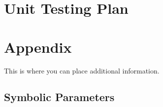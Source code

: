 \documentclass[12pt, titlepage]{article}
\begin{document}



					
					
					
					
					

					
					
					
					



				
\section{Unit Testing Plan}
		





\newpage

\section{Appendix}

This is where you can place additional information.

\subsection{Symbolic Parameters}
\end{document}
